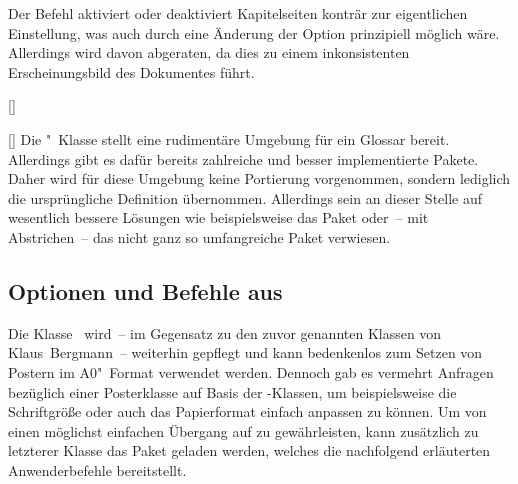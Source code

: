 \begin{DeclareEntity}{}
\begin{Declaration}
  {}
\printdeclarationlist
%
Der Befehl aktiviert oder deaktiviert Kapitelseiten konträr zur eigentlichen 
Einstellung, was auch durch eine Änderung der Option  
prinzipiell möglich wäre. Allerdings wird davon abgeraten, da dies zu einem 
inkonsistenten Erscheinungsbild des Dokumentes führt.
\end{Declaration}

\begin{Declaration}
  {[]}
\begin{Declaration}
  {[]}
\printdeclarationlist
%
Die "~Klasse stellt eine rudimentäre Umgebung für ein Glossar 
bereit. Allerdings gibt es dafür bereits zahlreiche und besser implementierte 
Pakete. Daher wird für diese Umgebung keine Portierung vorgenommen, sondern 
lediglich die ursprüngliche Definition übernommen. Allerdings sein an dieser 
Stelle auf wesentlich bessere Lösungen wie beispielsweise das Paket 
 oder~-- mit Abstrichen~-- das nicht ganz so umfangreiche 
Paket  verwiesen.
\end{Declaration}
\end{Declaration}
%



\subsection{%
  Optionen und Befehle aus %
}
%
%
Die Klasse~ wird~-- im Gegensatz zu den zuvor genannten 
Klassen von Klaus~Bergmann~-- weiterhin gepflegt und kann bedenkenlos zum 
Setzen von Postern im A0"~Format verwendet werden. Dennoch gab es vermehrt 
Anfragen bezüglich einer Posterklasse auf Basis der \TUDScript-Klassen, um 
beispielsweise die Schriftgröße oder auch das Papierformat einfach anpassen zu 
können. Um von  einen möglichst einfachen Übergang auf 
 zu gewährleisten, kann zusätzlich zu letzterer Klasse das 
Paket  geladen werden, welches die nachfolgend erläuterten 
Anwenderbefehle bereitstellt.


\end{DeclareEntity}
